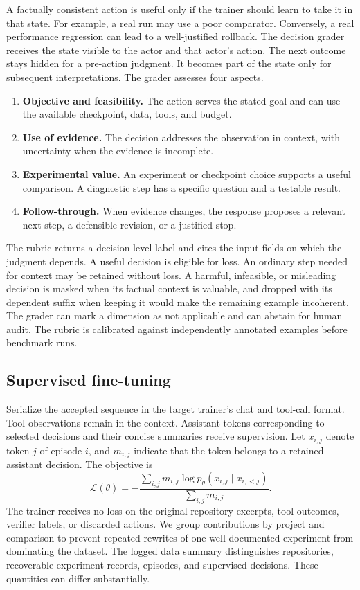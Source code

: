 \documentclass{article}
\begin{document}
A factually consistent action is useful only if the trainer should learn to take it in that state. For example, a real run may use a poor comparator. Conversely, a real performance regression can lead to a well-justified rollback. The decision grader receives the state visible to the actor and that actor's action. The next outcome stays hidden for a pre-action judgment. It becomes part of the state only for subsequent interpretations. The grader assesses four aspects.

\begin{enumerate}
  \item \textbf{Objective and feasibility.} The action serves the stated goal and can use the available checkpoint, data, tools, and budget.
  \item \textbf{Use of evidence.} The decision addresses the observation in context, with uncertainty when the evidence is incomplete.
  \item \textbf{Experimental value.} An experiment or checkpoint choice supports a useful comparison. A diagnostic step has a specific question and a testable result.
  \item \textbf{Follow-through.} When evidence changes, the response proposes a relevant next step, a defensible revision, or a justified stop.
\end{enumerate}

The rubric returns a decision-level label and cites the input fields on which the judgment depends. A useful decision is eligible for loss. An ordinary step needed for context may be retained without loss. A harmful, infeasible, or misleading decision is masked when its factual context is valuable, and dropped with its dependent suffix when keeping it would make the remaining example incoherent. The grader can mark a dimension as not applicable and can abstain for human audit. The rubric is calibrated against independently annotated examples before benchmark runs.

\subsection{Supervised fine-tuning}

Serialize the accepted sequence in the target trainer's chat and tool-call format. Tool observations remain in the context. Assistant tokens corresponding to selected decisions and their concise summaries receive supervision. Let \(x_{i,j}\) denote token \(j\) of episode \(i\), and \(m_{i,j}\) indicate that the token belongs to a retained assistant decision. The objective is
\begin{equation}
\mathcal{L}(\theta)=
-\frac{\sum_{i,j}m_{i,j}\log p_\theta(x_{i,j}\mid x_{i,<j})}
 {\sum_{i,j}m_{i,j}}.
\end{equation}
The trainer receives no loss on the original repository excerpts, tool outcomes, verifier labels, or discarded actions. We group contributions by project and comparison to prevent repeated rewrites of one well-documented experiment from dominating the dataset. The logged data summary distinguishes repositories, recoverable experiment records, episodes, and supervised decisions. These quantities can differ substantially.
\end{document}
